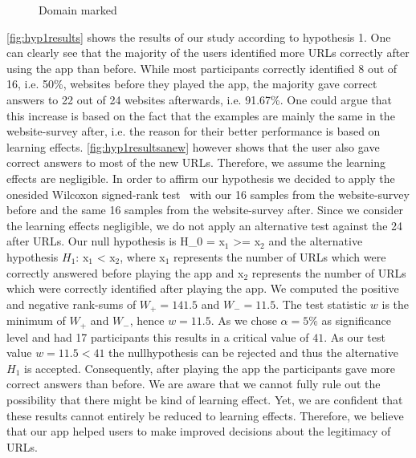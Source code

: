 \begin{figure}
\centering
{}
\caption{Domain marked}
\label{fig:hyp3results}
\end{figure}

\begin{description}[leftmargin=0cm]
\item[Hypothesis 1]
\autoref{fig:hyp1results} shows the results of our study according to hypothesis 1. One can clearly see that the majority of the users identified more URLs correctly after using the app than before. While most participants correctly identified 8 out of 16, i.e. 50\%, websites before they played the app, the majority gave correct answers to 22 out of 24 websites afterwards, i.e. 91.67\%. One could argue that this increase is based on the fact that the examples are mainly the same in the website-survey after, i.e. the reason for their better performance is based on learning effects. \autoref{fig:hyp1resultsanew} however shows that the user also gave correct answers to most of the new URLs. Therefore, we assume the learning effects are negligible.
In order to affirm our hypothesis we decided to apply the onesided Wilcoxon signed-rank test~\cite{wilcoxon1945individual} with our 16 samples from the website-survey before and the same 16 samples from the website-survey after.
Since we consider the learning effects negligible, we do not apply an alternative test against the 24 after URLs.
Our null hypothesis is H_{0} = x$_{1}$ >= x$_{2}$ and the alternative hypothesis $H_{1}$: x$_{1}$ < x$_{2}$, where x$_{1}$ represents the number of URLs which were correctly answered before playing the app and x$_{2}$ represents the number of URLs which were correctly identified after playing the app.
We computed the positive and negative rank-sums of $W_{+} = 141.5$ and $W_{-} = 11.5$.
The test statistic $w$ is the minimum of $W_{+}$ and $W_{-}$, hence $w = 11.5$.
As we chose $\alpha = 5\%$ as significance level and had 17 participants this results in a critical value of $41$.
As our test value $w = 11.5 < 41$ the nullhypothesis can be rejected and thus the alternative $H_{1}$ is accepted.
Consequently, after playing the app the participants gave more correct answers than before.
We are aware that we cannot fully rule out the possibility that there might be kind of learning effect.
Yet, we are confident that these results cannot entirely be reduced to learning effects.
Therefore, we believe that our app helped users to make improved decisions about the legitimacy of URLs.

\end{description}
